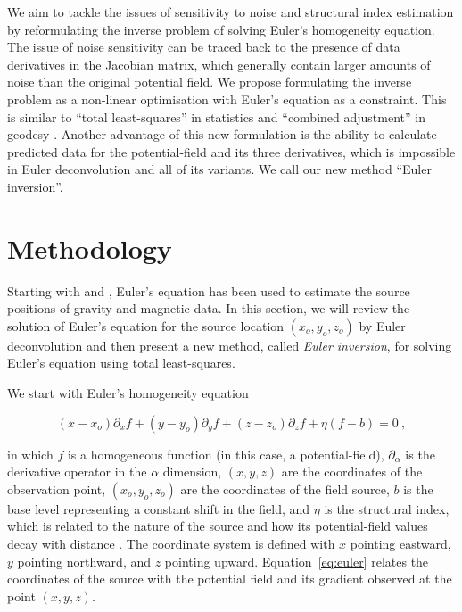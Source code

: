 We aim to tackle the issues of sensitivity to noise and structural index estimation by reformulating the inverse problem of solving Euler's homogeneity equation.
The issue of noise sensitivity can be traced back to the presence of data derivatives in the Jacobian matrix, which generally contain larger amounts of noise than the original potential field.
We propose formulating the inverse problem as a non-linear optimisation with Euler's equation as a constraint.
This is similar to ``total least-squares'' in statistics \citep{VanHuffel1991} and ``combined adjustment'' in geodesy \citep{Vanicek1986}.
Another advantage of this new formulation is the ability to calculate predicted data for the potential-field and its three derivatives, which is impossible in Euler deconvolution and all of its variants.
We call our new method ``Euler inversion''.

\section{Methodology}

Starting with \citet{Thompson1982} and \citet{Reid1990}, Euler's equation has
been used to estimate the source positions of gravity and magnetic data.
In this section, we will review the solution of Euler's equation for
the source location $(x_o, y_o, z_o)$ by Euler deconvolution \citep{Reid1990} and then present a
new method, called \textit{Euler inversion}, for solving Euler's equation using
total least-squares.

We start with Euler's homogeneity equation

\begin{equation}
  (x - x_o)\partial_x f + (y - y_o)\partial_y f + (z - z_o)\partial_z f
  + \eta(f - b) = 0
  \ ,
  \label{eq:euler}
\end{equation}

\noindent
in which $f$ is a homogeneous function (in this case, a potential-field),
$\partial_\alpha$ is the derivative operator in the $\alpha$ dimension,
$(x, y, z)$ are the coordinates of the observation point,
$(x_o, y_o, z_o)$ are the coordinates of the field source,
$b$ is the base level representing a constant shift in the field,
and $\eta$ is the structural index, which is related to the nature of the
source and how its potential-field values decay with distance
\citep{Ruddock1966,Reid2014}.
The coordinate system is defined with $x$ pointing eastward, $y$ pointing northward, and $z$ pointing upward.
Equation~\ref{eq:euler} relates the coordinates of the source with the
potential field and its gradient observed at the point $(x, y, z)$.

